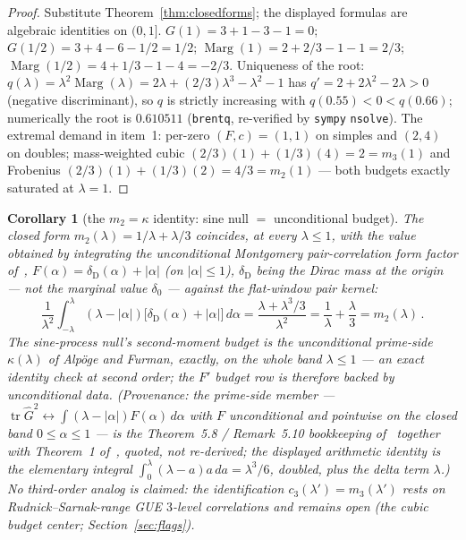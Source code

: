 \documentclass[11pt]{article}
\theoremstyle{plain}
\newtheorem{corollary}[theorem]{Corollary}
\theoremstyle{definition}
\theoremstyle{remark}
\newcommand{\Gh}{\widehat{G}}
\newcommand{\tr}{\operatorname{tr}}
\newcommand{\Marg}{\operatorname{Marg}}
\begin{document}
\begin{proof}
Substitute Theorem~\ref{thm:closedforms}; the displayed formulas are algebraic
identities on $(0, 1]$. $G(1) = 3 + 1 - 3 - 1 = 0$;
$G(1/2) = 3 + 4 - 6 - 1/2 = 1/2$; $\Marg(1) = 2 + 2/3 - 1 - 1 = 2/3$;
$\Marg(1/2) = 4 + 1/3 - 1 - 4 = -2/3$. Uniqueness of the root:
$q(\lambda) = \lambda^2 \Marg(\lambda)
= 2\lambda + (2/3)\lambda^3 - \lambda^2 - 1$ has
$q' = 2 + 2\lambda^2 - 2\lambda > 0$ (negative discriminant), so $q$ is strictly
increasing with $q(0.55) < 0 < q(0.66)$; numerically the root is $0.610511$
(\texttt{brentq}, re-verified by \texttt{sympy} \texttt{nsolve}). The extremal
demand in item~1: per-zero $(F, c) = (1, 1)$ on simples and $(2, 4)$ on doubles;
mass-weighted cubic $(2/3)(1) + (1/3)(4) = 2 = m_3(1)$ and Frobenius
$(2/3)(1) + (1/3)(2) = 4/3 = m_2(1)$ --- both budgets exactly saturated at
$\lambda = 1$.
\end{proof}

\begin{corollary}[the $m_2 = \kappa$ identity: sine null $=$ unconditional budget]
\label{cor:m2kappa}
The closed form $m_2(\lambda) = 1/\lambda + \lambda/3$ coincides, at every
$\lambda \le 1$, with the value obtained by integrating the unconditional
Montgomery pair-correlation form factor of~\cite{BGSTB24},
$F(\alpha) = \delta_{\mathrm{D}}(\alpha) + |\alpha|$ (on $|\alpha| \le 1$),
$\delta_{\mathrm{D}}$ being the Dirac mass at the origin --- not the marginal
value $\delta_0$ --- against the flat-window pair kernel:
\[
  \frac{1}{\lambda^2} \int_{-\lambda}^{\lambda} (\lambda - |\alpha|)
    \bigl[ \delta_{\mathrm{D}}(\alpha) + |\alpha| \bigr]\, d\alpha
  = \frac{\lambda + \lambda^3/3}{\lambda^2}
  = \frac{1}{\lambda} + \frac{\lambda}{3}
  = m_2(\lambda) \,.
\]
The sine-process null's second-moment budget is the unconditional prime-side
$\kappa(\lambda)$ of Alp\"oge and Furman, exactly, on the whole band
$\lambda \le 1$ --- an exact identity check at second order; the $F'$ budget row
is therefore backed by unconditional data. (Provenance: the prime-side member
--- $\tr \Gh^2 \leftrightarrow \int (\lambda - |\alpha|) F(\alpha)\, d\alpha$
with $F$ unconditional and pointwise on the closed band $0 \le \alpha \le 1$
--- is the Theorem~5.8 / Remark~5.10 bookkeeping of~\cite{AF26} together with
Theorem~1 of~\cite{BGSTB24}, quoted, not re-derived; the displayed arithmetic
identity is the elementary integral
$\int_0^\lambda (\lambda - a) a\, da = \lambda^3/6$, doubled, plus the delta
term $\lambda$.) No third-order analog is claimed: the identification
$c_3(\lambda') = m_3(\lambda')$ rests on Rudnick--Sarnak-range GUE $3$-level
correlations and remains open (the cubic budget center;
Section~\ref{sec:flags}).
\end{corollary}
\end{document}
